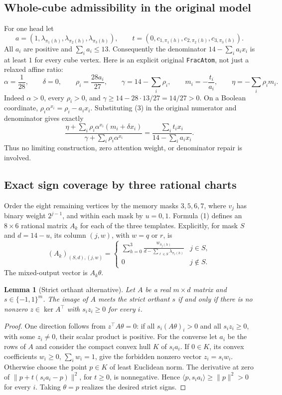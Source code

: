 \documentclass[11pt]{article}
\newtheorem{lemma}[theorem]{Lemma}
\begin{document}
\subsection*{Whole-cube admissibility in the original model}
For one head let
\[
 a=(1,\lambda_{\pi_1(h)},\lambda_{\pi_2(h)},
                         \lambda_{\pi_3(h)}),\qquad
 t=(0,c_{1,\pi_1(h)},c_{2,\pi_2(h)},c_{3,\pi_3(h)}).
\]
All $a_i$ are positive and $\sum_i a_i\le13$. Consequently the
denominator $14-\sum_i a_ix_i$ is at least $1$ for every cube vertex.
Here is an explicit original \texttt{FracAtom}, not just a relaxed
affine ratio:
\[
 \alpha=\frac1{28},\qquad \delta=0,\qquad
 \rho_i=\frac{28a_i}{27},\qquad
 \gamma=14-\sum_i\rho_i,\qquad
 m_i=-\frac{t_i}{a_i},\qquad \eta=-\sum_i\rho_i m_i.
 \tag{3}
\]
Indeed $\alpha>0$, every $\rho_i>0$, and
$\gamma\ge14-28\cdot13/27=14/27>0$. On a Boolean coordinate,
$\rho_i\alpha^{x_i}=\rho_i-a_ix_i$. Substituting (3) in the
original numerator and denominator gives exactly
\[
 \frac{\eta+\sum_i\rho_i\alpha^{x_i}(m_i+\delta x_i)}
      {\gamma+\sum_i\rho_i\alpha^{x_i}}
 =\frac{\sum_i t_ix_i}{14-\sum_i a_ix_i}.
\]
Thus no limiting construction, zero attention weight, or denominator
repair is involved.

\subsection*{Exact sign coverage by three rational charts}
Order the eight remaining vertices by the memory masks
$3,5,6,7$, where $v_j$ has binary weight $2^{j-1}$, and within each
mask by $u=0,1$. Formula (1) defines an $8\times6$ rational matrix
$A_k$ for each of the three templates. Explicitly, for mask $S$
and $d=14-u$, its column $(j,w)$, with $w=q$ or $r$, is
\[
 (A_k)_{(S,d),(j,w)}=
 \begin{cases}
 \displaystyle\sum_{h=0}^3
 \frac{w_{\pi_j(h)}}{d-\sum_{\ell\in S}\lambda_{\pi_\ell(h)}}
       &j\in S,\\[3pt]
 0&j\notin S.
 \end{cases}
 \tag{4}
\]
The mixed-output vector is $A_k\theta$.

\begin{lemma}[Strict orthant alternative]
Let $A$ be a real $m\times d$ matrix and $s\in\{-1,1\}^m$.
The image of $A$ meets the strict orthant $s$ if and only if
there is no nonzero $z\in\ker A^\top$ with $s_i z_i\ge0$
for every $i$.
\end{lemma}
\begin{proof}
One direction follows from
$z^\top A\theta=0$: if all $s_i(A\theta)_i>0$ and all
$s_i z_i\ge0$, with some $z_i\ne0$, their scalar product is positive.
For the converse let $a_i$ be the rows of $A$ and consider the compact
convex hull $K$ of $s_i a_i$. If $0\in K$, its convex coefficients
$w_i\ge0$, $\sum_iw_i=1$, give the forbidden nonzero vector
$z_i=s_iw_i$. Otherwise choose the point $p\in K$ of least Euclidean
norm. The derivative at zero of
$\|p+t(s_i a_i-p)\|^2$, for $t\ge0$, is nonnegative. Hence
$\langle p,s_i a_i\rangle\ge\|p\|^2>0$ for every $i$.
Taking $\theta=p$ realizes the desired strict signs.
\end{proof}
\end{document}
